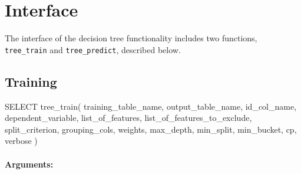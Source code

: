\section{Interface} %
\label{sec:interface}
The interface of the decision tree functionality includes two functions,
\texttt{tree\_train} and \texttt{tree\_predict}, described below.

\subsection{Training} %
\label{sub:training}
\begin{sql}
    SELECT tree_train(
            training_table_name,
            output_table_name,
            id_col_name,
            dependent_variable,
            list_of_features,
            list_of_features_to_exclude,
            split_criterion,
            grouping_cols,
            weights,
            max_depth,
            min_split,
            min_bucket,
            cp,
            verbose
    )
\end{sql}

\paragraph{Arguments:}

